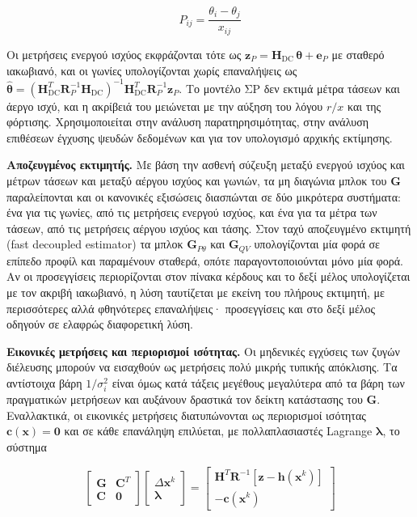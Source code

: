 \begin{equation}
P_{ij} = \frac{\theta_i - \theta_j}{x_{ij}}
\label{eq:dcflow}
\end{equation}

Οι μετρήσεις ενεργού ισχύος εκφράζονται τότε ως $\mathbf{z}_P = \mathbf{H}_{\mathrm{DC}}\,
\boldsymbol{\theta} + \mathbf{e}_P$ με σταθερό ιακωβιανό, και οι γωνίες υπολογίζονται χωρίς
επαναλήψεις ως $\hat{\boldsymbol{\theta}} = (\mathbf{H}_{\mathrm{DC}}^{T}\mathbf{R}_P^{-1}
\mathbf{H}_{\mathrm{DC}})^{-1}\mathbf{H}_{\mathrm{DC}}^{T}\mathbf{R}_P^{-1}\mathbf{z}_P$. Το
μοντέλο ΣΡ δεν εκτιμά μέτρα τάσεων και άεργο ισχύ, και η ακρίβειά του μειώνεται με την αύξηση
του λόγου $r/x$ και της φόρτισης. Χρησιμοποιείται στην ανάλυση παρατηρησιμότητας, στην
ανάλυση επιθέσεων έγχυσης ψευδών δεδομένων και για τον υπολογισμό αρχικής εκτίμησης.

\textbf{Αποζευγμένος εκτιμητής.} Με βάση την ασθενή σύζευξη μεταξύ ενεργού ισχύος και μέτρων
τάσεων και μεταξύ αέργου ισχύος και γωνιών, τα μη διαγώνια μπλοκ του $\mathbf{G}$ παραλείπονται
και οι κανονικές εξισώσεις διασπώνται σε δύο μικρότερα συστήματα: ένα για τις γωνίες, από
τις μετρήσεις ενεργού ισχύος, και ένα για τα μέτρα των τάσεων, από τις μετρήσεις αέργου
ισχύος και τάσης. Στον ταχύ αποζευγμένο εκτιμητή (fast decoupled estimator) τα μπλοκ
$\mathbf{G}_{P\theta}$ και $\mathbf{G}_{QV}$ υπολογίζονται μία φορά σε επίπεδο προφίλ και
παραμένουν σταθερά, οπότε παραγοντοποιούνται μόνο μία φορά. Αν οι προσεγγίσεις περιορίζονται
στον πίνακα κέρδους και το δεξί μέλος υπολογίζεται με τον ακριβή ιακωβιανό, η λύση ταυτίζεται
με εκείνη του πλήρους εκτιμητή, με περισσότερες αλλά φθηνότερες επαναλήψεις· προσεγγίσεις και
στο δεξί μέλος οδηγούν σε ελαφρώς διαφορετική λύση.

\textbf{Εικονικές μετρήσεις και περιορισμοί ισότητας.} Οι μηδενικές εγχύσεις των ζυγών
διέλευσης μπορούν να εισαχθούν ως μετρήσεις πολύ μικρής τυπικής απόκλισης. Τα αντίστοιχα βάρη
$1/\sigma_i^2$ είναι όμως κατά τάξεις μεγέθους μεγαλύτερα από τα βάρη των πραγματικών
μετρήσεων και αυξάνουν δραστικά τον δείκτη κατάστασης του $\mathbf{G}$. Εναλλακτικά, οι
εικονικές μετρήσεις διατυπώνονται ως περιορισμοί ισότητας $\mathbf{c}(\mathbf{x}) = \mathbf{0}$
και σε κάθε επανάληψη επιλύεται, με πολλαπλασιαστές Lagrange $\boldsymbol{\lambda}$, το σύστημα

\begin{equation}
\begin{bmatrix} \mathbf{G} & \mathbf{C}^{T} \\ \mathbf{C} & \mathbf{0} \end{bmatrix}
\begin{bmatrix} \Delta\mathbf{x}^{k} \\ \boldsymbol{\lambda} \end{bmatrix}
=
\begin{bmatrix} \mathbf{H}^{T}\mathbf{R}^{-1}\left[\mathbf{z} - \mathbf{h}(\mathbf{x}^{k})\right] \\ -\mathbf{c}(\mathbf{x}^{k}) \end{bmatrix}
\label{eq:eqconstr}
\end{equation}

